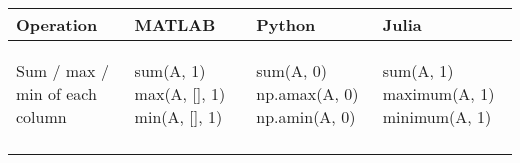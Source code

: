 \documentclass[10pt, landscape]{article}
\newenvironment{Shaded}{}{}
\newcommand{\DecValTok}[1]{\textcolor[rgb]{0.25,0.63,0.44}{{#1}}}
\newcommand{\FloatTok}[1]{\textcolor[rgb]{0.25,0.63,0.44}{{#1}}}
\newcommand{\BuiltInTok}[1]{{#1}}
\newcommand{\NormalTok}[1]{{#1}}
\begin{document}
\begin{multicols}{2}
\begin{tabular}[ ]{@{}llll@{}}
\toprule
\begin{minipage}[b]{0.23\columnwidth}\raggedright\strut
Operation\strut
\end{minipage} & \begin{minipage}[b]{0.22\columnwidth}\raggedright\strut
MATLAB\strut
\end{minipage} & \begin{minipage}[b]{0.24\columnwidth}\raggedright\strut
Python\strut
\end{minipage} & \begin{minipage}[b]{0.20\columnwidth}\raggedright\strut
Julia\strut
\end{minipage}\tabularnewline
\midrule
\begin{minipage}[t]{0.23\columnwidth}\raggedright\strut
Sum / max / min of each column\strut
\end{minipage} & \begin{minipage}[t]{0.22\columnwidth}\raggedright\strut
\begin{Shaded}
\begin{Highlighting}[]
\NormalTok{sum(A, }\FloatTok{1}\NormalTok{)}
\NormalTok{max(A, [], }\FloatTok{1}\NormalTok{)}
\NormalTok{min(A, [], }\FloatTok{1}\NormalTok{)}
\end{Highlighting}
\end{Shaded}
\strut
\end{minipage} & \begin{minipage}[t]{0.24\columnwidth}\raggedright\strut
\begin{Shaded}
\begin{Highlighting}[]
\BuiltInTok{sum}\NormalTok{(A, }\DecValTok{0}\NormalTok{)}
\NormalTok{np.amax(A, }\DecValTok{0}\NormalTok{)}
\NormalTok{np.amin(A, }\DecValTok{0}\NormalTok{)}
\end{Highlighting}
\end{Shaded}
\strut
\end{minipage} & \begin{minipage}[t]{0.20\columnwidth}\raggedright\strut
\begin{Shaded}
\begin{Highlighting}[]
\NormalTok{sum(A, }\FloatTok{1}\NormalTok{)}
\NormalTok{maximum(A, }\FloatTok{1}\NormalTok{)}
\NormalTok{minimum(A, }\FloatTok{1}\NormalTok{)}
\end{Highlighting}
\end{Shaded}
\strut
\end{minipage}\tabularnewline
\begin{minipage}[t]{0.23\columnwidth}\raggedright\strut

\end{minipage}
\end{tabular}
\end{multicols}
\end{document}

